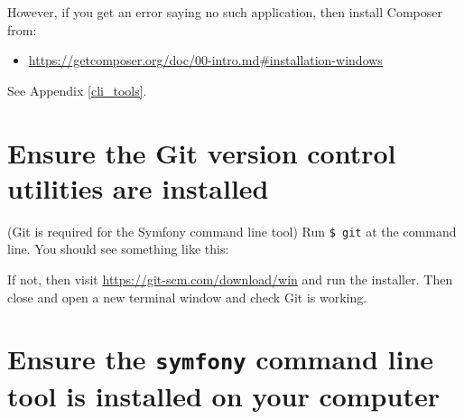 \documentclass[a4paperpaper,openright]{book}
\newenvironment{Shaded}{}{}
\newcommand{\ExtensionTok}[1]{#1}
\newcommand{\FunctionTok}[1]{\textcolor[rgb]{0.02,0.16,0.49}{#1}}
\newcommand{\NormalTok}[1]{#1}
\newcommand{\OperatorTok}[1]{\textcolor[rgb]{0.40,0.40,0.40}{#1}}
\providecommand{\tightlist}{%
  \setlength{\itemsep}{0pt}\setlength{\parskip}{0pt}}
\begin{document}
However, if you get an error saying no such application, then install
Composer from:

\begin{itemize}
\tightlist
\item
  \url{https://getcomposer.org/doc/00-intro.md\#installation-windows}
\end{itemize}

See Appendix \ref{cli_tools}.

\hypertarget{ensure-the-git-version-control-utilities-are-installed}{%
\section{Ensure the Git version control utilities are
installed}\label{ensure-the-git-version-control-utilities-are-installed}}

(Git is required for the Symfony command line tool) Run \texttt{\$\ git}
at the command line. You should see something like this:

\begin{Shaded}
\end{Shaded}

If not, then visit \url{https://git-scm.com/download/win} and run the
installer. Then close and open a new terminal window and check Git is
working.

\hypertarget{ensure-the-symfony-command-line-tool-is-installed-on-your-computer}{%
\section{\texorpdfstring{Ensure the \texttt{symfony} command line tool
is installed on your
computer}{Ensure the symfony command line tool is installed on your computer}}\label{ensure-the-symfony-command-line-tool-is-installed-on-your-computer}}
\end{document}
